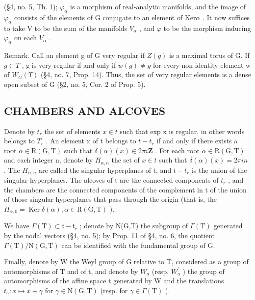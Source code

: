 (§4, no. 5, Th. 1); \(\varphi_{\alpha}\) is a morphism of real-analytic manifolds, and the image of \(\varphi_{\alpha}\) consists of the elements of G conjugate to an element of \(\mathrm{Ker} \alpha\) . It now suffices to take V to be the sum of the manifolds \(V_{\alpha}\) , and \(\varphi\) to be the morphism inducing \(\varphi_{\alpha}\) on each \(V_{\alpha}\) .

Remark. Call an element g of G very regular if \(Z(g)\) is a maximal torus of G. If \(g \in T\) , g is very regular if and only if \(w(g) \neq g\) for every non-identity element w of \(W_{G}(T)\) (§4, no. 7, Prop. 14). Thus, the set of very regular elements is a dense open subset of G (§2, no. 5, Cor. 2 of Prop. 5).

\subsection{CHAMBERS AND ALCOVES}

Denote by \(t_{r}\) the set of elements \(x \in t\) such that exp x is regular, in other words belongs to \(T_{r}\) . An element x of t belongs to \(t - t_{r}\) if and only if there exists a root \(\alpha \in \mathrm{R}(\mathrm{G}, \mathrm{T})\) such that \(\delta(\alpha)(x) \in 2\pi i\mathbf{Z}\) . For each root \(\alpha \in \mathrm{R}(\mathrm{G}, \mathrm{T})\) and each integer n, denote by \(H_{\alpha,n}\) the set of \(x \in t\) such that \(\delta(\alpha)(x) = 2\pi in\) . The \(H_{\alpha,n}\) are called the singular hyperplanes of t, and \(t - t_{r}\) is the union of the singular hyperplanes. The alcoves of t are the connected components of \(t_{r}\) , and the chambers are the connected components of the complement in t of the union of those singular hyperplanes that pass through the origin (that is, the \(H_{\alpha,0} = \operatorname{Ker}\delta(\alpha), \alpha \in \mathrm{R}(\mathrm{G}, \mathrm{T})\) ).

We have \(\varGamma(\mathrm{T})\subset\mathfrak{t}-\mathfrak{t}_{r}\) ; denote by N(G,T) the subgroup of \(\varGamma(\mathrm{T})\) generated by the nodal vectors (§4, no. 5); by Prop. 11 of §4, no. 6, the quotient \(\varGamma(\mathrm{T})/\mathrm{N}(\mathrm{G},\mathrm{T})\) can be identified with the fundamental group of G.

Finally, denote by W the Weyl group of G relative to T, considered as a group of automorphisms of T and of t, and denote by \(W_{a}\) (resp. \(W_{a}^{\prime}\) ) the group of automorphisms of the affine space t generated by W and the translations \(t_{\gamma}: x \mapsto x + \gamma\) for \(\gamma \in \mathrm{N}(\mathrm{G}, \mathrm{T})\) (resp. for \(\gamma \in \Gamma(\mathrm{T})\) ).

